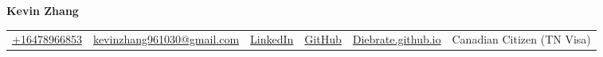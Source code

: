 \documentclass{article}
\begin{document}
    \fontsize{9}{15}
    \selectfont
    \begin{center}
        \begin{center}
            \huge\bfseries Kevin Zhang
        \end{center}
            \begin{tabular}{c|c|c|c|c|c}
                \href{tel:+16478966853}{+16478966853} &
                \href{mailto:kevinkzhang961030@gmail.com}{kevinzhang961030@gmail.com} & 
                \href{https://www.linkedin.com/in/kevin-zhang-uoft/}{LinkedIn} & 
                \href{https://github.com/diebrate/}{GitHub} &
                \href{https://diebrate.github.io/}{Diebrate.github.io} &
                Canadian Citizen (TN Visa)
        \end{tabular}
    \end{center}    
    \vspace{-0.75em}
    
    
    
    
    
    
  
\end{document}
